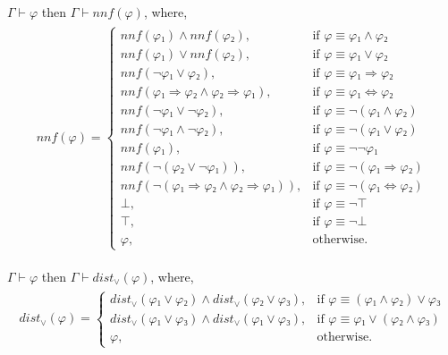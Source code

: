 \documentclass[../main.tex]{subfiles}
\begin{document}
\begin{lemma}
  \label{lem:lem-nnf}
  $Γ ⊢ φ$ then $Γ ⊢ nnf(φ)$, where,
  \begin{align*}
    \begin{split}
    \label{eq:nnf-definition}
    nnf(φ) =
      \begin{cases}
      nnf(φ₁) ∧ nnf(φ₂),
         &\text{if }φ ≡ φ₁ ∧ φ₂ \\
      nnf(φ₁) ∨ nnf(φ₂),
         &\text{if }φ ≡ φ₁ ∨ φ₂ \\
      nnf(¬ φ₁ ∨ φ₂),
         &\text{if }φ ≡ φ₁ ⇒ φ₂ \\
      nnf(φ₁ ⇒ φ₂ ∧ φ₂ ⇒ φ₁),
         &\text{if }φ ≡ φ₁ ⇔ φ₂ \\
      nnf(¬ φ₁ ∨ ¬ φ₂),
         &\text{if }φ ≡ ¬ (φ₁ ∧ φ₂) \\
      nnf(¬ φ₁ ∧ ¬ φ₂),
         &\text{if }φ ≡ ¬ (φ₁ ∨ φ₂) \\
      nnf(φ₁),
         &\text{if }φ ≡ ¬ ¬ φ₁ \\
      nnf(¬ (φ₂ ∨ ¬ φ₁)),
         &\text{if }φ ≡ ¬ (φ₁ ⇒ φ₂) \\
      nnf(¬ (φ₁ ⇒ φ₂ ∧ φ₂ ⇒ φ₁)),
         &\text{if }φ ≡ ¬ (φ₁ ⇔ φ₂) \\
      ⊥,  &\text{if }φ ≡ ¬ ⊤ \\
      ⊤,  &\text{if }φ ≡ ¬ ⊥ \\
      φ,  & \text{otherwise}.
      \end{cases}
    \end{split}
  \end{align*}
\end{lemma}

\begin{lemma}
  \label{lem:lem-dist-or}
  $Γ ⊢ φ$ then $Γ ⊢ dist_{∨}(φ)$, where,
  \begin{align*}
      \begin{split}
      dist_{∨}(φ) =
        \begin{cases}
          dist_{∨}(φ₁ ∨ φ₂) ∧ dist_{∨}(φ₂ ∨ φ₃),
            &\text{if }φ ≡ (φ₁ ∧ φ₂) ∨ φ₃\\
          dist_{∨}(φ₁ ∨ φ₃) ∧ dist_{∨}(φ₁ ∨ φ₃),
            &\text{if }φ ≡ φ₁ ∨ (φ₂ ∧ φ₃)\\
          φ, &\text{otherwise.}
        \end{cases}
      \end{split}
  \end{align*}
\end{lemma}
\end{document}
